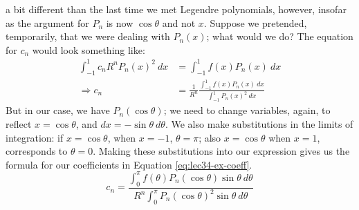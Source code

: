  a bit different than the last time we met Legendre polynomials, however, insofar as the argument for $P_n$ is now $\cos{\theta}$ and not $x$.  Suppose we pretended, temporarily, that we were dealing with $P_n(x)$; what would we do?  The equation for $c_n$ would look something like:
\begin{align*}
\int_{-1}^{1}c_n R^n P_n(x)^2 \ dx &= \int_{-1}^{1} f(x) P_n(x) \ dx \\
\Rightarrow c_n &= \frac{1}{R^n}\frac{\int_{-1}^{1} f(x) P_n(x) \ dx}{\int_{-1}^{1} P_n(x)^2 \ dx}
\end{align*}
But in our case, we have $P_n(\cos{\theta})$; we need to change variables, again, to reflect $x = \cos{\theta}$, and $dx = -\sin{\theta} \ d\theta$.  We also make substitutions in the limits of integration: if $x=\cos{\theta}$, when $x=-1$, $\theta = \pi$;  also $x=\cos{\theta}$ when $x=1$, corresponds to $\theta = 0$.  Making these substitutions into our expression gives us the formula for our coefficients in Equation \ref{eq:lec34-ex-coeff}.
\begin{equation}
c_n = \frac{\int_{0}^{\pi} f(\theta) P_n(\cos{\theta}) \sin{\theta} \ d\theta}{R^n\int_{0}^{\pi} P_n(\cos{\theta})^2 \sin{\theta} \ d\theta}
\label{eq:lec34-ex-coeff}
\end{equation}


